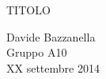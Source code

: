 \begin{center}

     	{\huge TITOLO}

     	\vspace{0.2cm}
	\vspace{0.3cm}

      	{\large Davide Bazzanella} \\
		{ Gruppo A10} \\
	
	\vspace{0.1cm}
      	{ XX settembre 2014 }

\end{center}
